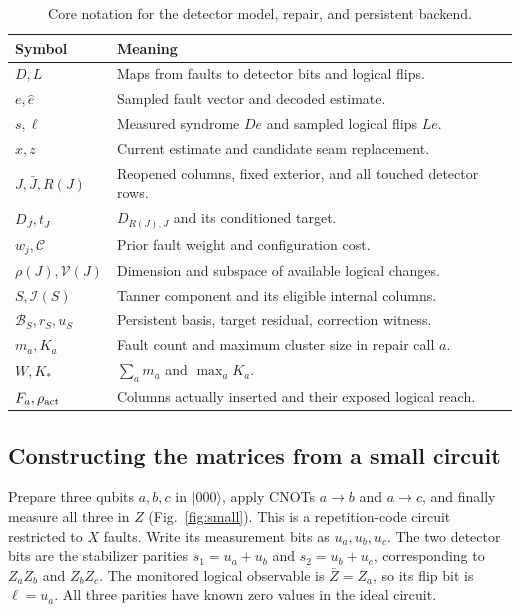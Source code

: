 \documentclass[10pt,letterpaper,twocolumn]{article}
\newcommand{\cost}{\mathcal C}
\newcommand{\reach}{\mathcal V}
\begin{document}
\begin{table}[t]\centering\small
\caption{Core notation for the detector model, repair, and persistent backend.}\label{tab:notation}
\begin{tabular}{@{}p{}p{}@{}}\toprule
Symbol&Meaning\\\midrule
$D,L$&Maps from faults to detector bits and logical flips.\\
$e,\hat e$&Sampled fault vector and decoded estimate.\\
$s,\ell$&Measured syndrome $De$ and sampled logical flips $Le$.\\
$x,z$&Current estimate and candidate seam replacement.\\
$J,\bar J,R(J)$&Reopened columns, fixed exterior, and all touched detector rows.\\
$D_J,t_J$&$D_{R(J),J}$ and its conditioned target.\\
$w_j,\cost$&Prior fault weight and configuration cost.\\
$\rho(J),\reach(J)$&Dimension and subspace of available logical changes.\\
$S,\mathcal I(S)$&Tanner component and its eligible internal columns.\\
$\mathcal B_S,r_S,u_S$&Persistent basis, target residual, correction witness.\\
$m_a,K_a$&Fault count and maximum cluster size in repair call $a$.\\
$W,K_*$&$\sum_a m_a$ and $\max_aK_a$.\\
$F_a,\rho_{\rm act}$&Columns actually inserted and their exposed logical reach.\\\bottomrule
\end{tabular}\end{table}

\subsection{Constructing the matrices from a small circuit}
Prepare three qubits $a,b,c$ in $|000\rangle$, apply CNOTs $a\to b$ and $a\to c$, and finally measure all three in $Z$ (Fig.~\ref{fig:small}). This is a repetition-code circuit restricted to $X$ faults. Write its measurement bits as $u_a,u_b,u_c$. The two detector bits are the stabilizer parities $s_1=u_a+u_b$ and $s_2=u_b+u_c$, corresponding to $Z_aZ_b$ and $Z_bZ_c$. The monitored logical observable is $\bar Z=Z_a$, so its flip bit is $\ell=u_a$. All three parities have known zero values in the ideal circuit.
\end{document}

